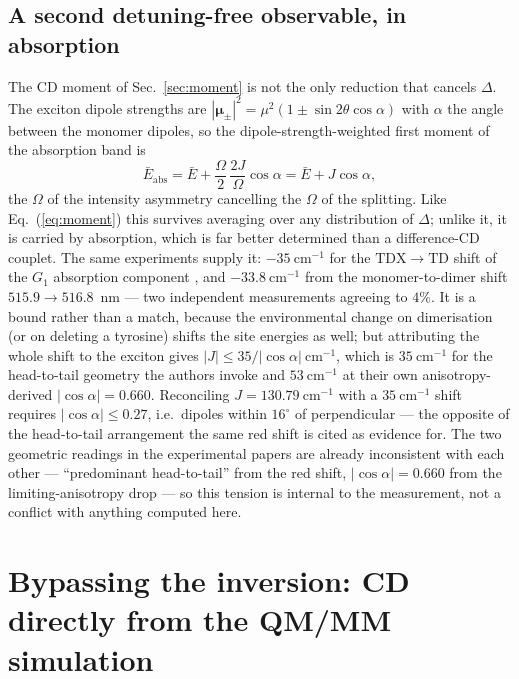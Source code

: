 \documentclass[11pt,a4paper]{article}
\newcommand{\muv}{\bm{\mu}}
\begin{document}
\subsection*{A second detuning-free observable, in absorption}

The CD moment of Sec.~\ref{sec:moment} is not the only reduction that cancels
$\Delta$. The exciton dipole strengths are
$|\muv_{\pm}|^{2}=\mu^{2}(1\pm\sin2\theta\cos\alpha)$ with $\alpha$ the angle
between the monomer dipoles, so the dipole-strength-weighted first moment of
the absorption band is
\begin{equation}
\bar{E}_{\mathrm{abs}}
=\bar{E}+\frac{\Omega}{2}\,\frac{2J}{\Omega}\cos\alpha
=\bar{E}+J\cos\alpha ,
\label{eq:absmoment}
\end{equation}
the $\Omega$ of the intensity asymmetry cancelling the $\Omega$ of the
splitting. Like Eq.~(\ref{eq:moment}) this survives averaging over any
distribution of $\Delta$; unlike it, it is carried by absorption, which is far
better determined than a difference-CD couplet. The same experiments supply it:
$-35~\mathrm{cm^{-1}}$ for the $\mathrm{TDX}\to\mathrm{TD}$ shift of the
$G_{1}$ absorption component \cite{nguyen2025}, and $-33.8~\mathrm{cm^{-1}}$
from the monomer-to-dimer shift $515.9\to516.8$~nm \cite{kim2019} --- two
independent measurements agreeing to $4\%$. It is a bound rather than a match,
because the environmental change on dimerisation (or on deleting a tyrosine)
shifts the site energies as well; but attributing the whole shift to the
exciton gives $|J|\le 35/|\cos\alpha|~\mathrm{cm^{-1}}$, which is
$35~\mathrm{cm^{-1}}$ for the head-to-tail geometry the authors invoke and
$53~\mathrm{cm^{-1}}$ at their own anisotropy-derived $|\cos\alpha|=0.660$.
Reconciling $J=130.79~\mathrm{cm^{-1}}$ with a $35~\mathrm{cm^{-1}}$ shift
requires $|\cos\alpha|\le0.27$, i.e.\ dipoles within $16^{\circ}$ of
perpendicular --- the opposite of the head-to-tail arrangement the same red
shift is cited as evidence for. The two geometric readings in the experimental
papers are already inconsistent with each other --- ``predominant head-to-tail''
from the red shift, $|\cos\alpha|=0.660$ from the limiting-anisotropy drop ---
so this tension is internal to the measurement, not a conflict with anything
computed here.

\section{Bypassing the inversion: CD directly from the QM/MM simulation}
\label{sec:direct}
\end{document}
